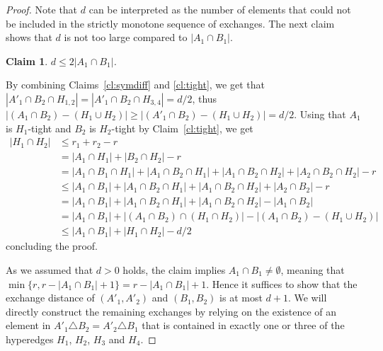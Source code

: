 \documentclass[11pt,a4paper]{article}
\theoremstyle{plain}
\newtheorem{cl}[thm]{Claim}
\theoremstyle{definition}
\newenvironment{claimproof}[1][\proofname]
  {%
    \proof[#1]%
      \renewcommand*\qedsymbol{$\bullet$}%
  }
  {%
    \endproof%
  }
\begin{document}
\begin{proof}
Note that $d$ can be interpreted as the number of elements that could not be included in the strictly monotone sequence of exchanges. The next claim shows that $d$ is not too large compared to $|A_1\cap B_1|$.

\begin{cl}\label{cl:d}
$d\leq 2|A_1\cap B_1|$.
\end{cl}
\begin{claimproof}
By combining Claims~\ref{cl:symdiff} and \ref{cl:tight}, we get that $|A'_1 \cap B_2 \cap H_{1,2}| = |A'_1 \cap B_2 \cap H_{3,4}| = d/2$, thus $|(A_1 \cap B_2) - (H_1 \cup H_2)| \ge |(A'_1 \cap B_2) - (H_1 \cup H_2) | = d/2$. Using that $A_1$ is $H_1$-tight and $B_2$ is $H_2$-tight by Claim~\ref{cl:tight}, we get
\begin{align*}
    |H_1\cap H_2|
    {}&{}\leq
    r_1+r_2-r\\
    {}&{} = |A_1\cap H_1|+|B_2\cap H_2|-r\\
    {}&{} = |A_1\cap B_1\cap H_1|+|A_1\cap B_2\cap H_1|+|A_1\cap B_2\cap H_2|+|A_2\cap B_2\cap H_2|-r\\
    {}&{} \le |A_1 \cap B_1| + |A_1 \cap B_2 \cap H_1| + |A_1 \cap B_2 \cap H_2| + |A_2 \cap B_2| -r \\ 
    {}&{} = |A_1 \cap B_1| + |A_1 \cap B_2 \cap H_1| + |A_1 \cap B_2 \cap H_2| - |A_1 \cap B_2| \\ 
    {}&{} = |A_1\cap B_1|+|(A_1 \cap B_2) \cap (H_1 \cap H_2)| - |(A_1\cap B_2)-(H_1\cup H_2)|\\
    {}&{}\leq
    |A_1\cap B_1|+|H_1\cap H_2|-d/2 
\end{align*}
concluding the proof.
\end{claimproof}

As we assumed that $d>0$ holds, the claim implies $A_1\cap B_1\neq \emptyset$, meaning that $\min\{r,r-|A_1\cap B_1|+1\}=r-|A_1\cap B_1|+1$. Hence it suffices to show that the exchange distance of $(A'_1,A'_2)$ and $(B_1,B_2)$ is at most $d+1$. We will directly construct the remaining exchanges by relying on the existence of an element in $A'_1\triangle B_2=A'_2\triangle B_1$ that is contained in exactly one or three of the hyperedges $H_1$, $H_2$, $H_3$ and $H_4$.


\end{proof}
\end{document}
